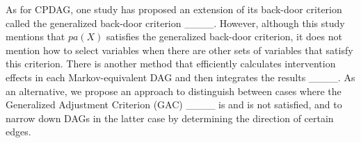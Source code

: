 As for CPDAG, one study has proposed an extension of its back-door criterion called the generalized back-door criterion ____. However, although this study mentions that $pa(X)$ satisfies the generalized back-door criterion, it does not mention how to select variables when there are other sets of variables that satisfy this criterion. There is another method that efficiently calculates intervention effects in each Markov-equivalent DAG and then integrates the results ____. As an alternative, we propose an approach to distinguish between cases where the Generalized Adjustment Criterion (GAC) ____ is and is not satisfied, and to narrow down DAGs in the latter case by determining the direction of certain edges.